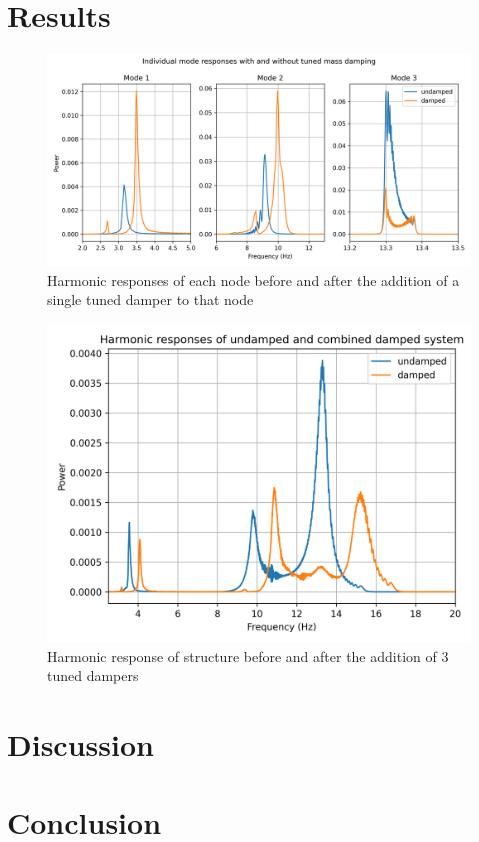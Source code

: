 \documentclass{article}
\begin{document}

\section{Results}

\begin{figure}[H]
    \centering
    \includegraphics[width=1\textwidth]{modes.png}
    \caption{\label{fig:modes} Harmonic responses of each node before and after the addition of a single tuned damper to that node}
\end{figure}

\begin{figure}[H]
    \centering
    \includegraphics[width=1\textwidth]{combined_full_sweep.png}
    \caption{\label{fig:combined_full_sweep} Harmonic response of structure before and after the addition of 3 tuned dampers}
\end{figure}

\section{Discussion}


\section{Conclusion}
\end{document}
